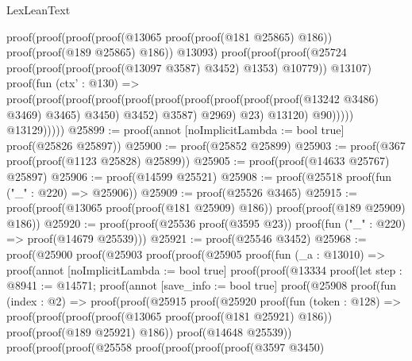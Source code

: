\begin{lexlean}{LexLeanText}
\begin{coremodule}
                  proof(proof(proof(proof(@13065 proof(proof(@181 @25865) @186))
                          proof(proof(@189 @25865) @186))
                        @13093)
                      proof(proof(proof(@25724
                              proof(proof(proof(proof(@13097 @3587) @3452) @1353) @10779))
                            @13107)
                          proof(fun (ctx' : @130) =>
                            proof(proof(proof(proof(proof(proof(proof(proof(proof(proof(@13242
                                                  @3486)
                                                @3469)
                                              @3465)
                                            @3450)
                                          @3452)
                                        @3587)
                                      @2969)
                                    @23)
                                  @13120)
                                @90)))))
                @13129)))))
@25899 := proof(annot [noImplicitLambda := bool true] proof(@25826 @25897))
@25900 := proof(@25852 @25899)
@25903 := proof(@367 proof(proof(@1123 @25828) @25899))
@25905 := proof(proof(@14633 @25767) @25897)
@25906 := proof(@14599 @25521)
@25908 := proof(@25518 proof(fun ("_" : @220) => @25906))
@25909 := proof(@25526 @3465)
@25915 := proof(proof(@13065 proof(proof(@181 @25909) @186)) proof(proof(@189 @25909) @186))
@25920 := proof(proof(@25536 proof(@3595 @23)) proof(fun ("_" : @220) => proof(@14679 @25539)))
@25921 := proof(@25546 @3452)
@25968 := proof(@25900
      proof(@25903
          proof(proof(@25905
                proof(fun (_a : @13010) =>
                  proof(annot [noImplicitLambda := bool true]
                    proof(proof(@13334
                          proof(let step : @8941 := @14571;
                            proof(annot [save_info := bool true]
                              proof(@25908
                                  proof(fun (index : @2) =>
                                    proof(proof(@25915
                                          proof(@25920
                                              proof(fun (token : @128) =>
                                                proof(proof(proof(proof(@13065
                                                          proof(proof(@181 @25921) @186))
                                                        proof(proof(@189 @25921) @186))
                                                      proof(@14648 @25539))
                                                    proof(proof(proof(@25558
                                                            proof(proof(proof(proof(@3597 @3450)

\end{coremodule}
\end{lexlean}
